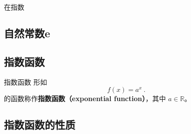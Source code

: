 
\begin{issues}
\issueDraft
\end{issues}


在指数


\subsection{自然常数e}

\subsection{指数函数}

\begin{definition}{指数函数}
形如
\begin{equation}
f(x) = a^x~.
\end{equation}
的函数称作\textbf{指数函数（exponential function）}，其中 $a\in\mathbb R$。
\end{definition}
\subsection{指数函数的性质}

